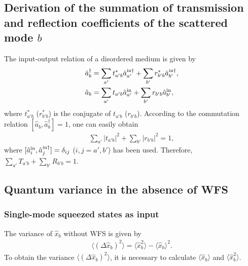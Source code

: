 \documentclass[9pt,twocolumn,twoside]{osajnl}
\begin{document}
\subsection{Derivation of the summation of transmission and reflection coefficients of the scattered mode $b$}
\label{derivation}
The input-output relation of a disordered medium is given by
\begin{align}
\hat{a}_{b}^{\dagger} &= \sum_{a'}{t_{a'b}^{\ast} \hat{a}_{a'}^{\rm{in}\dagger} } +\sum_{b'} {r_{b'b}^{\ast} \hat{a}_{b'}^{\rm{in} \dagger}}, \\ \nonumber
\hat{a}_{b} &= \sum_{a'}{t_{a'b} \hat{a}_{a'}^{\rm{in}} } +\sum_{b'} {r_{b'b} \hat{a}_{b'}^{\rm{in}}},
\end{align}
where $t_{a'b}^{\ast}$ ($r_{b'b}^{\ast}$) is the conjugate of $t_{a'b}$ ($r_{b'b}$). According to the commutation relation $[\hat{a}_b, \hat{a}_b^{\dagger}] = 1$, one can easily obtain 
\begin{align}
\sum_{a'} |t_{a'b}|^2 + \sum_{b'} |r_{b'b}|^2 = 1,
\end{align}
where $[\hat{a}_{i}^{\rm{in}}, \hat{a}_{j}^{\rm{in}\dagger}] = \delta_{ij}$ ($i,j=a',b'$) has been used. Therefore, $\sum_{a'} T_{a'b} + \sum_{b'} R_{b'b} = 1$.

\subsection{Quantum variance in the absence of WFS}
\subsubsection{Single-mode squeezed states as input}
\label{appsinglemode}
The variance of $\hat{x}_b$ without WFS is given by
\begin{align}
\label{v2b}
\langle (\Delta \hat{x}_b)^2\rangle = \langle \hat{x}_b^2\rangle - \langle \hat{x}_b\rangle^2.
\end{align}
To obtain the variance $\langle (\Delta \hat{x}_b)^2\rangle$, it is necessary to calculate $ \langle \hat{x}_b\rangle$ and $\langle \hat{x}_b^2\rangle$.
\end{document}
